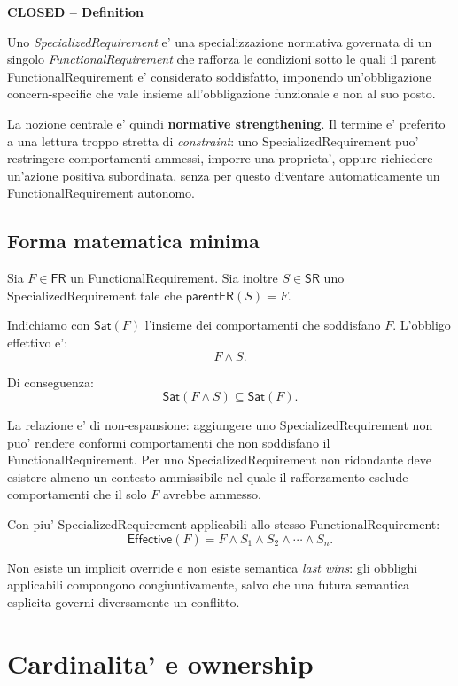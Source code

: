 \documentclass[11pt,a4paper]{article}
\newcommand{\FR}{\mathsf{FR}}
\newcommand{\SR}{\mathsf{SR}}
\newcommand{\Sat}{\mathsf{Sat}}
\newcommand{\parent}{\mathsf{parentFR}}
\newcommand{\closed}{\textbf{CLOSED}}
\newenvironment{statusbox}[1]{%
  \def\FrameCommand{\fcolorbox{ddtablue}{ddtagray}}%
  \MakeFramed{\advance\hsize-2\width\FrameRestore}
  \noindent\textbf{#1}\par\smallskip
}{\endMakeFramed}
\begin{document}
\begin{statusbox}{\closed{} -- Definition}
Uno \emph{SpecializedRequirement} e' una specializzazione normativa governata di un singolo \emph{FunctionalRequirement} che rafforza le condizioni sotto le quali il parent FunctionalRequirement e' considerato soddisfatto, imponendo un'obbligazione concern-specific che vale insieme all'obbligazione funzionale e non al suo posto.
\end{statusbox}

La nozione centrale e' quindi \textbf{normative strengthening}. Il termine e' preferito a una lettura troppo stretta di \emph{constraint}: uno SpecializedRequirement puo' restringere comportamenti ammessi, imporre una proprieta', oppure richiedere un'azione positiva subordinata, senza per questo diventare automaticamente un FunctionalRequirement autonomo.

\subsection{Forma matematica minima}

Sia $F \in \FR$ un FunctionalRequirement. Sia inoltre $S \in \SR$ uno SpecializedRequirement tale che $\parent(S)=F$.

Indichiamo con $\Sat(F)$ l'insieme dei comportamenti che soddisfano $F$. L'obbligo effettivo e':
\[
  F \land S.
\]

Di conseguenza:
\[
  \Sat(F \land S) \subseteq \Sat(F).
\]

La relazione e' di non-espansione: aggiungere uno SpecializedRequirement non puo' rendere conformi comportamenti che non soddisfano il FunctionalRequirement. Per uno SpecializedRequirement non ridondante deve esistere almeno un contesto ammissibile nel quale il rafforzamento esclude comportamenti che il solo $F$ avrebbe ammesso.

Con piu' SpecializedRequirement applicabili allo stesso FunctionalRequirement:
\[
  \mathsf{Effective}(F)=F \land S_1 \land S_2 \land \cdots \land S_n.
\]

Non esiste un implicit override e non esiste semantica \emph{last wins}: gli obblighi applicabili compongono congiuntivamente, salvo che una futura semantica esplicita governi diversamente un conflitto.

\section{Cardinalita' e ownership}
\end{document}
